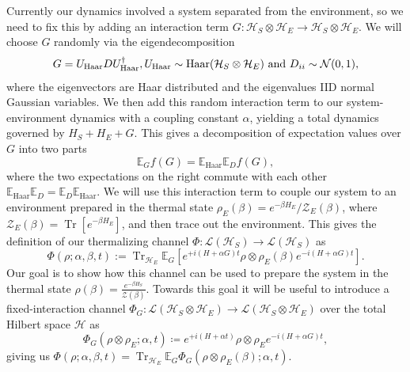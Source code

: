 \documentclass{article}
\newcommand{\haar}{\text{Haar}}
\newcommand{\brackets}[1]{\left[ #1 \right]}
\DeclareMathOperator{\Tr}{Tr}
\newcommand{\trace}[1]{\Tr \brackets{ #1 }}
\newcommand{\hilb}{\mathcal{H}}
\newcommand{\partfun}{\mathcal{Z}}
\begin{document}
Currently our dynamics involved a system separated from the environment, so we need to fix this by adding an interaction term $G : \hilb_S \otimes \hilb_E \to \hilb_S \otimes \hilb_E$. We will choose $G$ randomly via the eigendecomposition 
\begin{equation}
    G = U_{\haar} D U_{\haar}^\dagger, U_{\haar} \sim {\rm Haar}(\hilb_S \otimes \hilb_E) \text{ and } D_{ii} \sim \mathcal{N}(0,1), \label{eq:interaction_def}
\end{equation}
where the eigenvectors are Haar distributed and the eigenvalues IID normal Gaussian variables. We then add this random interaction term to our system-environment dynamics with a coupling constant $\alpha$, yielding a total dynamics governed by $H_S + H_E + G$. This gives a decomposition of expectation values over $G$ into two parts 
\begin{equation}
    \mathbb{E}_G f(G) = \mathbb{E}_{\haar} \mathbb{E}_{D} f(G),
\end{equation}
where the two expectations on the right commute with each other $\mathbb{E}_{\haar} \mathbb{E}_{D} = \mathbb{E}_{D} \mathbb{E}_{\haar} $. We will use this interaction term to couple our system to an environment prepared in the thermal state $\rho_E(\beta) = e^{-\beta H_E} /\partfun_E(\beta)$, where $\partfun_E(\beta) = \trace{e^{-\beta H_E}}$, and then trace out the environment. This gives the definition of our thermalizing channel $\Phi : \mathcal{L}(\hilb_S) \to \mathcal{L}(\hilb_S)$ as
\begin{equation}\label{eq:PhiDef}
    \Phi(\rho ; \alpha, \beta, t) :=  \Tr_{\hilb_E} \mathbb{E}_{G} \left[ e^{+i(H + \alpha G)t} \rho \otimes \rho_E(\beta) e^{-i(H + \alpha G) t}\right].
\end{equation}
Our goal is to show how this channel can be used to prepare the system in the thermal state $\rho(\beta) = \frac{e^{-\beta H_S}}{\partfun(\beta)}$. Towards this goal it will be useful to introduce a fixed-interaction channel $\Phi_G : \mathcal{L}(\hilb_S \otimes \hilb_E) \to \mathcal{L}(\hilb_S \otimes \hilb_E)$ over the total Hilbert space $\hilb$ as 
\begin{equation}
    \Phi_G(\rho \otimes \rho_E; \alpha, t) \coloneqq e^{+i(H + \alpha t)} \rho \otimes \rho_E e^{- i(H + \alpha G)t}, \label{eq:phi_g_definition}
\end{equation}
giving us $\Phi(\rho; \alpha, \beta, t) = \Tr_{\hilb_E} \mathbb{E}_G \Phi_G(\rho \otimes \rho_E(\beta); \alpha, t)$. 
\end{document}
